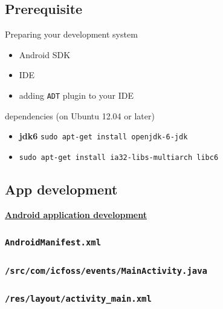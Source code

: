\documentclass{beamer}
\begin{document}
 \subsection{Prerequisite}
 \begin{frame}{Preparing your development system}
   \begin{block}{}
     \begin{itemize}
       \item Android SDK
       \item IDE
       \item adding {\tt ADT} plugin to your IDE
     \end{itemize}
   \end{block}

   \begin{block}{dependencies (on Ubuntu 12.04 or later)}
     \begin{itemize}
     \item {\bf jdk6} {\tt sudo apt-get install openjdk-6-jdk} \pause
     \item {\tt sudo apt-get install ia32-libs-multiarch libc6}
     \end{itemize}
   \end{block}
 \end{frame}

 \subsection{App development}
 \begin{frame}
   \centerline{\href{file:///opt/aakashdemo/android.svg}{\bf
       Android application development}}
 \end{frame}

\begin{frame}[fragile]
  \frametitle{\texttt{AndroidManifest.xml}}
    
\end{frame}

\begin{frame}[fragile]
  \frametitle{\texttt{/src/com/icfoss/events/MainActivity.java}}
    
\end{frame}

\begin{frame}[fragile]
  \frametitle{\texttt{/res/layout/activity\_main.xml}}
    
\end{frame}
\end{document}
